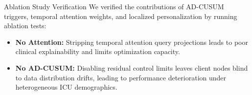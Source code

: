 \documentclass[aspectratio=169, 11pt]{beamer}
\begin{document}
\begin{frame}{Ablation Study Verification}
    \small
    We verified the contributions of AD-CUSUM triggers, temporal attention weights, and localized personalization by running ablation tests:
    \vspace{0.2cm}
    \begin{table}
        \centering
        \renewcommand{\arraystretch}{1.1}
    \end{table}
    \vspace{0.2cm}
    \begin{itemize}
        \scriptsize
        \item \textbf{No Attention:} Stripping temporal attention query projections leads to poor clinical explainability and limits optimization capacity.
        \item \textbf{No AD-CUSUM:} Disabling residual control limits leaves client nodes blind to data distribution drifts, leading to performance deterioration under heterogeneous ICU demographics.
    \end{itemize}
\end{frame}
\end{document}
